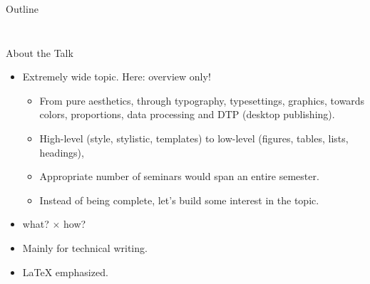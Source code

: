 \documentclass[xcolor=dvipsnames, aspectratio=169, handout, intlimits]{beamer}
\begin{document}
\begin{frame}{Outline}
\begin{columns}
\begin{column}{0.35\textwidth}
\begin{animateinline}{\mFrameRate}
{		}%
	\end{animateinline}
	\end{column}		
\end{columns}
	
\end{frame}

\begin{frame}{About the Talk}

\vspace{-0.5cm}
\begin{itemize}
	\item Extremely wide topic. Here: \textcolor{elmagLight}{overview only!}
	\begin{itemize}
		\item From pure aesthetics, through typography, typesettings, graphics, towards colors, proportions, data processing and DTP (\small{desktop publishing}).
		\item High-level (style, stylistic, templates) to low-level (figures, tables, lists, headings),
		\item Appropriate number of seminars would span an entire semester.
		\item Instead of being complete, let's build some interest in the topic.
	\end{itemize}
	\item<2-> \textcolor{elmagLight}{what?} $\times$ \textcolor{elmagLight}{how?}
	\item<3-> Mainly for technical writing.
	\item<4-> \LaTeX{} emphasized.	
\end{itemize}

\vspace{0.25cm}

\end{frame}
\end{document}
